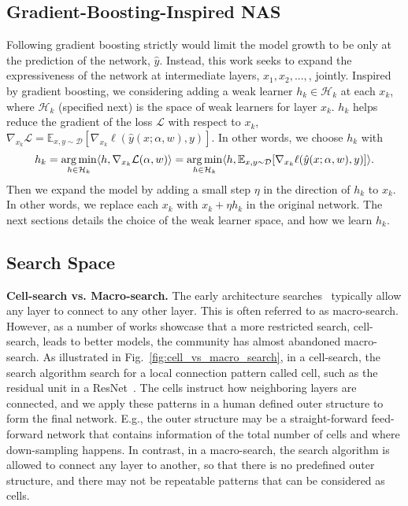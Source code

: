 \subsection{Gradient-Boosting-Inspired NAS}
\label{sec:gb_nas}
Following gradient boosting strictly would limit the model growth to be only at the prediction of the network, $\hat{y}$. 
Instead, this work seeks to expand the expressiveness of the network at intermediate layers, $x_1, x_2,...,$, jointly.
Inspired by gradient boosting, we considering adding a weak learner $h_k \in \mathcal{H}_k$ at each $x_k$, where 
$\mathcal{H}_k$ (specified next) is the space of weak learners for layer $x_k$. 
$h_k$ helps reduce the gradient of the loss $\mathcal{L}$ with respect to $x_k$, $\nabla _{x_k} \mathcal{L}  = \mathbb{E} _{x, y \sim \mathcal{D}} [ \nabla _{x_{k}} \ell(\hat{y}(x ; \alpha, w), y) ]$.
In other words, we choose $h_k$ with 
\begin{align}
h_k = \operatorname*{arg\,min} _{h \in \mathcal{H}_k} \langle h, 
\nabla _{x_k} \mathcal{L} (\alpha, w) \rangle = 
\operatorname*{arg\,min} _{h\in \mathcal{H}_k} \langle h, \mathbb{E} _{x, y \sim \mathcal{D}} [ \nabla _{x_{k}} \ell(\hat{y}(x ; \alpha, w), y) ] \rangle.
\label{eq:hallu_objective}
\end{align}
Then we expand the model by adding a small step $\eta$ in the direction of $h_k$ to $x_k$.  In other words, we replace each $x_k$ with $x_k + \eta h_k$ in the original network. 
The next sections details the choice of the weak learner space, and how we learn $h_k$. 

\subsection{Search Space}
\label{sec:search_space}

\textbf{Cell-search vs. Macro-search.}
The early architecture searches~\citep{nas,Real2017EvoNet} typically allow any layer to connect to any other layer. 
This is often referred to as macro-search. 
However, as a number of works \citep{NASCell,Real2018RegularizedEF,Pham2018EfficientNA} showcase that 
a more restricted search, cell-search, leads to better models, the community has almost abandoned macro-search.
As illustrated in Fig.~\ref{fig:cell_vs_macro_search}, in a cell-search, the search algorithm search for a local connection pattern called cell, 
such as the residual unit in a ResNet~\citep{resnet}. The cells instruct how neighboring layers are connected, and 
we apply these patterns in a human defined outer structure to form the final network. 
E.g., the outer structure may be a straight-forward feed-forward network that contains 
information of the total number of cells and where down-sampling happens. 
In contrast, in a macro-search, the search algorithm is allowed to connect any layer to another, 
so that there is no predefined outer structure, and there may not be repeatable patterns that can be considered as cells. 

